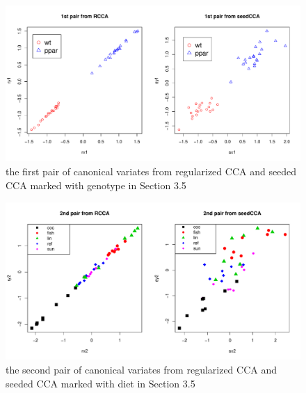 %
\begin{figure}\begin{center}
\includegraphics[width=12cm,height=6cm]{1stpair.pdf}
\vspace{-5mm}\caption{the first pair of canonical variates
from regularized CCA  and seeded CCA marked with genotype in Section 3.5}
\label{fpair}
\end{center}\end{figure}
%
\begin{figure}\begin{center}
\includegraphics[width=12cm,height=6cm]{2ndpair.pdf}
\vspace{-5mm}\caption{the second pair of canonical variates
from regularized CCA  and seeded CCA marked with diet in Section 3.5}
\label{spair}
\end{center}\end{figure}
%

